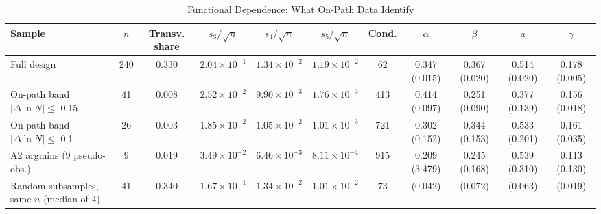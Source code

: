 \begin{table}[!htbp]
\centering
\scriptsize
\caption{Functional Dependence: What On-Path Data Identify}
\label{tab:m1_ident}
\begin{threeparttable}
\begin{tabular}{lcccccccccc}
\toprule
Sample & $n$ & Transv. share & $s_3/\sqrt n$ & $s_4/\sqrt n$ & $s_5/\sqrt n$ & Cond. & $\alpha$ & $\beta$ & $a$ & $\gamma$ \\
\midrule
Full design & 240 & 0.330 & $2.04\times10^{-1}$ & $1.34\times10^{-2}$ & $1.19\times10^{-2}$ & 62 & 0.347 (0.015) & 0.367 (0.020) & 0.514 (0.020) & 0.178 (0.005) \\
On-path band $|\Delta\ln N|\le$ 0.15 & 41 & 0.008 & $2.52\times10^{-2}$ & $9.90\times10^{-3}$ & $1.76\times10^{-3}$ & 413 & 0.414 (0.097) & 0.251 (0.090) & 0.377 (0.139) & 0.156 (0.018) \\
On-path band $|\Delta\ln N|\le$ 0.1 & 26 & 0.003 & $1.85\times10^{-2}$ & $1.05\times10^{-2}$ & $1.01\times10^{-3}$ & 721 & 0.302 (0.152) & 0.344 (0.153) & 0.533 (0.201) & 0.161 (0.035) \\
A2 argmins (9 pseudo-obs.) & 9 & 0.019 & $3.49\times10^{-2}$ & $6.46\times10^{-3}$ & $8.11\times10^{-4}$ & 915 & 0.209 (3.479) & 0.245 (0.168) & 0.539 (0.310) & 0.113 (0.130) \\
Random subsamples, same $n$ (median of 4) & 41 & 0.340 & $1.67\times10^{-1}$ & $1.34\times10^{-2}$ & $1.01\times10^{-2}$ & 73 & (0.042) & (0.072) & (0.063) & (0.019) \\
\bottomrule
\end{tabular}
\begin{tablenotes}[flushleft]
\footnotesize

\end{tablenotes}
\end{threeparttable}
\end{table}
